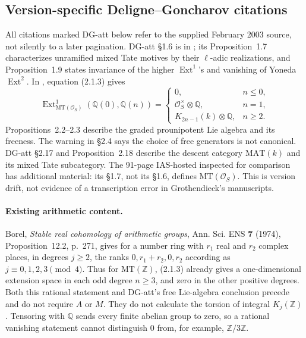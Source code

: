 \documentclass[11pt,a4paper]{article}
\theoremstyle{definition}
\begin{document}
\subsection{Version-specific Deligne--Goncharov citations}
All citations marked DG-att below refer to the supplied February 2003 source,
not silently to a later pagination.  DG-att \S1.6 is in
; its Proposition~1.7 characterizes unramified mixed Tate
motives by their \(\ell\)-adic realizations, and Proposition~1.9 states
invariance of the higher \(\operatorname{Ext}^1\)'s and vanishing of Yoneda
\(\operatorname{Ext}^2\).  In , equation (2.1.3) gives
\[
 \operatorname{Ext}^1_{\mathrm{MT}(\mathcal O_S)}
   (\mathbb Q(0),\mathbb Q(n))=
 \begin{cases}
 0,&n\leq0,\\
 \mathcal O_S^\times\otimes\mathbb Q,&n=1,\\
 K_{2n-1}(k)\otimes\mathbb Q,&n\geq2.
 \end{cases}
\]
Propositions~2.2--2.3 describe the graded prounipotent Lie algebra and its
freeness.  The warning in \S2.4 says the choice of free generators is not
canonical.  DG-att \S2.17 and Proposition~2.18 describe the descent category
\(\mathrm{MAT}(k)\) and its mixed Tate subcategory.  The 91-page IAS-hosted
 inspected for comparison has additional material: its
\S1.7, not its \S1.6, defines \(\mathrm{MT}(\mathcal O_S)\).  This is version
drift, not evidence of a transcription error in Grothendieck's manuscripts.

\paragraph{Existing arithmetic content.}
Borel, \emph{Stable real cohomology of arithmetic groups}, Ann. Sci. ENS
\textbf{7} (1974), Proposition~12.2, p.~271, gives for a number ring with
\(r_1\) real and \(r_2\) complex places, in degrees \(j\geq2\), the ranks
\(0,r_1+r_2,0,r_2\) according as \(j\equiv0,1,2,3\pmod4\).
Thus for \(\mathrm{MT}(\mathbb Z)\), (2.1.3) already gives a
one-dimensional extension space in each odd degree \(n\geq3\), and zero in
the other positive degrees.  Both this rational statement and DG-att's free
Lie-algebra conclusion precede and do not require \(A\) or \(M\).
They do not calculate the torsion of integral \(K_j(\mathbb Z)\).
Tensoring with \(\mathbb Q\) sends every finite abelian group to zero, so a
rational vanishing statement cannot distinguish \(0\) from, for example,
\(\mathbb Z/3\mathbb Z\).
\end{document}
